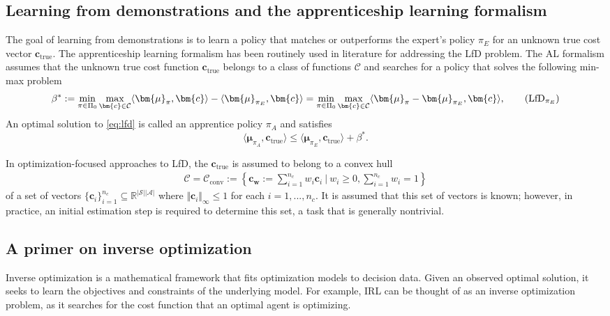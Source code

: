 \documentclass[10pt]{article} %
\def\C{\ensuremath{\mathcal{C}}}
\def\Ac{\ensuremath{\mathcal{A}}}
\def\vc{{\bm{c}}}
\def\vw{{\bm{w}}}
\def\vmu{{\bm{\mu}}}
\def\evw{{w}}
\newcommand{\R}{\mathbb{R}}
\newcommand{\St}{\mathcal{S}}
\begin{document}
\subsection{Learning from demonstrations and the apprenticeship learning formalism}
The goal of learning from demonstrations is to learn a policy that matches or outperforms the expert's policy $\pi_E$ for an unknown true cost vector $\vc_{\text{true}}$. The apprenticeship learning formalism \citep{Abbeel2004} has been routinely used in literature for addressing the LfD problem. The AL formalism assumes that the unknown true cost function $\vc_{\text{true}}$ belongs to a class of functions $\C$ and searches for a policy that solves the following min-max problem
\begin{align*}
    \beta^* := \min_{\pi\in\Pi_0}\max_{\vc\in \C}  \langle \vmu_{\pi}, \vc \rangle - \langle \vmu_{\pi_E}, \vc \rangle = \min_{\pi\in\Pi_0}\max_{\vc\in \C} \langle \vmu_{\pi} - \vmu_{\pi_E}, \vc \rangle, \tag{$\text{LfD}_{\pi_E}$} \label{eq:lfd}
\end{align*}
An optimal solution to \eqref{eq:lfd} is called an apprentice policy $\pi_A$ and satisfies $$\langle \vmu_{\pi_A}, \vc_{\text{true}} \rangle \leq \langle \vmu_{\pi_E}, \vc_{\text{true}} \rangle + \beta^*.$$\par

In optimization-focused approaches to LfD, the $\vc_{\text{true}}$ is assumed to belong to a convex hull \begin{align*}
\mathcal{C} = \mathcal{C}_{\text{conv}} := \left\{\vc_{\vw} := \sum\limits_{i=1}^{n_c} \evw_i\vc_i \: \Big| \: \evw_i \geq 0, \sum\limits_{i=1}^{n_c} \evw_i = 1\right\}
\end{align*}
\citep{Syed2008, Kamoutsi2021} of a set of vectors $\{\vc_i\}_{i=1}^{n_c} \subseteq \R^{|\St||\Ac|}$ where $\Vert \vc_i \Vert_\infty \leq 1$ for each $i=1,...,n_c$. It is assumed that this set of vectors is known; however, in practice, an initial estimation step is required to determine this set, a task that is generally nontrivial.

\subsection{A primer on inverse optimization} \label{sec:primerIO}
Inverse optimization is a mathematical framework that fits optimization models to decision data. Given an observed optimal solution, it seeks to learn the objectives and constraints of the underlying model. For example, IRL can be thought of as an inverse optimization problem, as it searches for the cost function that an optimal agent is optimizing. \par 
\end{document}
